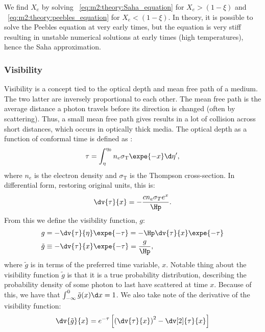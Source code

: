     We find $X_e$ by solving ~\cref{eq:m2:theory:Saha_equation} for $X_e > (1-\xi)$ and ~\cref{eq:m2:theory:peebles_equation} for $X_e < (1-\xi)$. In theory, it is possible to solve the Peebles equation at very early times, but the equation is very stiff resulting in unstable numerical solutions at early times (high temperatures), hence the Saha approximation.

\subsubsection{Visibility}\label{sec:m2:theory:visibility}
    Visibility is a concept tied to the optical depth and mean free path of a medium. The two latter are inversely proportional to each other. The mean free path is the average distance a photon travels before its direction is changed (often by scattering). Thus, a small mean free path gives results in a lot of collision across short distances, which occurs in optically thick media. The optical depth as a function of conformal time is defined as \cite{AST5220LectureNotes}:
    \begin{equation}\label{eq:m2:theory:optical_depth}
        \tau = \int_\eta^{\eta_0} n_e\sigma_\mathrm{T}\expe{-x}\d\eta',
    \end{equation}
    where $n_e$ is the electron density and $\sigma_\mathrm{T}$ is the Thompson cross-section. In differential form, restoring original units, this is:
    \begin{equation}\label{eq:m2:theory:optical_depth_differential}
        \dv{\tau}{x} = -\frac{cn_e\sigma_Te^x}{\Hp}.    
    \end{equation} 
    From this we define the visibility function, $g$:
    \begin{equation}\label{eq:m2:theory:visibility_function}
        \begin{split}
            g &= -\dv{\tau}{\eta}\expe{-\tau} = -\Hp\dv{\tau}{x}\expe{-\tau}\\
            \tilde{g} &\equiv -\dv{\tau}{x}\expe{-\tau} = \frac{g}{\Hp},
        \end{split}
    \end{equation}
    where $\tilde{g}$ is in terms of the preferred time variable, $x$. Notable thing about the visibility function $\tilde{g}$ is that it is a true probability distribution, describing the probability density of some photon to last have scattered at time $x$. Because of this, we have that $\int_{-\infty}^0\tilde{g}(x)\d x = 1$. We also take note of the derivative of the visibility function:
    \begin{equation}\label{eq:m2:theory:visibility_function_deriv}
        \dv{\tilde{g}}{x} = e^{-\tau}\left[\left(\dv{\tau}{x}\right)^2-\dv[2]{\tau}{x}\right]
    \end{equation}


